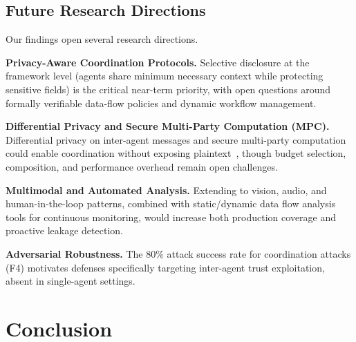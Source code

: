 \documentclass{ieeeaccess}
\begin{document}
\subsection{Future Research Directions}

Our findings open several research directions.

\textbf{Privacy-Aware Coordination Protocols.} Selective disclosure at the framework level (agents share minimum necessary context while protecting sensitive fields) is the critical near-term priority, with open questions around formally verifiable data-flow policies and dynamic workflow management.

\textbf{Differential Privacy and Secure Multi-Party Computation (MPC).} Differential privacy on inter-agent messages and secure multi-party computation could enable coordination without exposing plaintext~\cite{rathee2024mpcminimizedsecurellminference, fatima2025privacymas, luo2026secptuning}, though budget selection, composition, and performance overhead remain open challenges.

\textbf{Multimodal and Automated Analysis.} Extending to vision, audio, and human-in-the-loop patterns, combined with static/dynamic data flow analysis tools for continuous monitoring, would increase both production coverage and proactive leakage detection.

\textbf{Adversarial Robustness.} The 80\% attack success rate for coordination attacks (F4) motivates defenses specifically targeting inter-agent trust exploitation, absent in single-agent settings.

\section{Conclusion}
\label{sec:conclusion}
\end{document}
